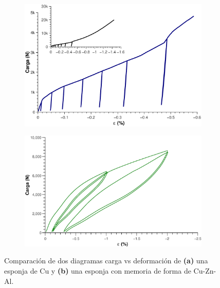 \documentclass[a4paper,12pt,fleqn,twoside,openany]{book}
\begin{document}
\begin{figure}[h]
 \centering
    \begin{subfigure}{0.49\textwidth}
        \includegraphics[width=\textwidth]{Img/Introduccion/Cucompararesponja.eps}
        \caption{}
        \label{fig:EspCu}
    \end{subfigure}
    \begin{subfigure}{0.45\textwidth}
        \includegraphics[width=\textwidth]{Img/Introduccion/EsponjacompararCu.eps}
        \caption{}
        \label{fig:EspA}
    \end{subfigure}

  \label{fig: proceso}
  \caption{Comparación de dos diagramas carga vs deformación de \textbf{(a)} una esponja de Cu y \textbf{(b)} una esponja con memoria de forma de Cu-Zn-Al.}
\end{figure}
\end{document}
